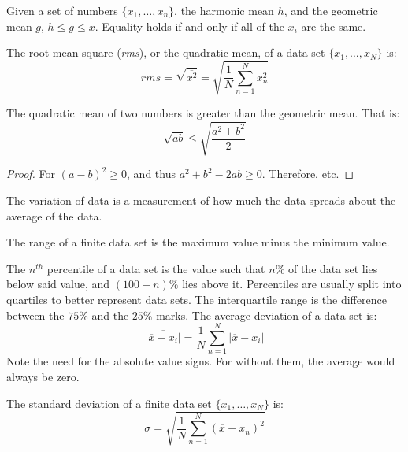 \documentclass[crop=false,class=book,oneside]{standalone}
\begin{document}
        \begin{theorem}
            Given a set of numbers $\{x_{1},\hdots,x_{n}\}$,
            the harmonic mean $h$, and the geometric mean $g$,
            $h\leq{g}\leq\overline{x}$. Equality holds if
            and only if all of the $x_{i}$ are the same.
        \end{theorem}
        \begin{definition}
            The root-mean square (\textit{rms}), or the
            quadratic mean, of a data set $\{x_{1},\hdots,x_{N}\}$
            is:
            \begin{equation*}
                rms=\sqrt{\overline{x^{2}}}
                =\sqrt{\frac{1}{N}\sum_{n=1}^{N}x_{n}^2}
            \end{equation*}
        \end{definition}
        \begin{theorem}
            The quadratic mean of two numbers is greater
            than the geometric mean. That is:
            \begin{equation*}
                \sqrt{ab}\leq\sqrt{\frac{a^{2}+b^{2}}{2}}
            \end{equation*}
        \end{theorem}
        \begin{proof}
            For $(a-b)^{2}\geq{0}$, and thus
            $a^{2}+b^{2}-2ab\geq{0}$. Therefore, etc.
        \end{proof}
        The variation of data is a measurement of how much
        the data spreads about the average of the data.
        \begin{definition}
            The range of a finite data set is the maximum value
            minus the minimum value.
        \end{definition}
        The $n^{th}$ percentile of a data set is the value such that
        $n\%$ of the data set lies below said value, and
        $(100-n)\%$ lies above it. Percentiles are usually split into
        quartiles to better represent data sets. The interquartile range
        is the difference between the $75\%$ and the $25\%$ marks.
        The average deviation of a data set is:
        \begin{equation*}
            \overline{|\overline{x}-x_{i}|}
            =\frac{1}{N}\sum_{n=1}^{N}|\overline{x}-x_{i}|
        \end{equation*}
        Note the need for the absolute value signs. For without them,
        the average would always be zero.
        \begin{definition}
            The standard deviation of a finite data set
            $\{x_{1},\hdots,x_{N}\}$ is:
            \begin{equation*}
                \sigma=
                \sqrt{\frac{1}{N}\sum_{n=1}^{N}(\overline{x}-x_{n})^{2}}
            \end{equation*}
        \end{definition}
\end{document}
